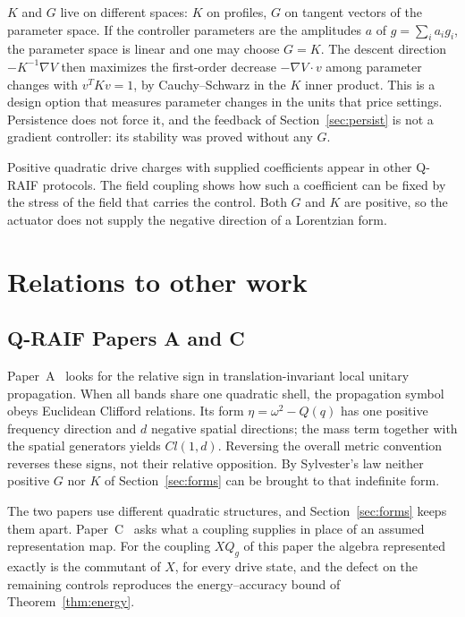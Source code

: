 \documentclass[aps,pre,onecolumn,superscriptaddress,floatfix,longbibliography]{revtex4-2}
\begin{document}
$K$ and $G$ live on different spaces: $K$ on profiles, $G$ on tangent vectors of the parameter space. If the controller parameters are the amplitudes $a$ of $g=\sum_ia_ig_i$, the parameter space is linear and one may choose $G=K$. The descent direction $-K^{-1}\nabla V$ then maximizes the first-order decrease $-\nabla V\cdot v$ among parameter changes with $v^TKv=1$, by Cauchy--Schwarz in the $K$ inner product. This is a design option that measures parameter changes in the units that price settings. Persistence does not force it, and the feedback of Section~\ref{sec:persist} is not a gradient controller: its stability was proved without any $G$.

Positive quadratic drive charges with supplied coefficients appear in other Q-RAIF protocols. The field coupling shows how such a coefficient can be fixed by the stress of the field that carries the control. Both $G$ and $K$ are positive, so the actuator does not supply the negative direction of a Lorentzian form.

\section{Relations to other work}
\label{sec:context}

\subsection{Q-RAIF Papers A and C}

Paper~A~\cite{Liu2026QRAIF_A} looks for the relative sign in translation-invariant local unitary propagation. When all bands share one quadratic shell, the propagation symbol obeys Euclidean Clifford relations. Its form $\eta=\omega^2-Q(q)$ has one positive frequency direction and $d$ negative spatial directions; the mass term together with the spatial generators yields $Cl(1,d)$. Reversing the overall metric convention reverses these signs, not their relative opposition. By Sylvester's law neither positive $G$ nor $K$ of Section~\ref{sec:forms} can be brought to that indefinite form.

The two papers use different quadratic structures, and Section~\ref{sec:forms} keeps them apart. Paper~C~\cite{Liu2026QRAIF_C} asks what a coupling supplies in place of an assumed representation map. For the coupling $XQ_g$ of this paper the algebra represented exactly is the commutant of $X$, for every drive state, and the defect on the remaining controls reproduces the energy--accuracy bound of Theorem~\ref{thm:energy}.
\end{document}
